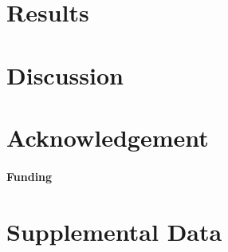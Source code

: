 \documentclass{frontiersSCNS} %
\begin{document}
\section{Results}

\section{Discussion}


\section*{Acknowledgement}


\paragraph{Funding\textcolon}

\section*{Supplemental Data}




\end{document}
